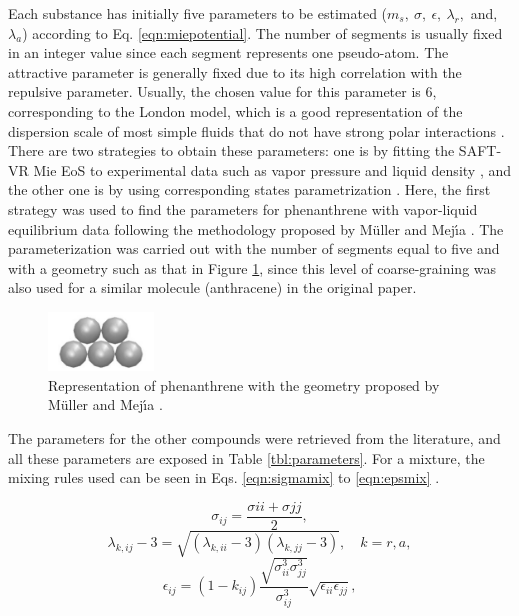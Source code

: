 \documentclass[final,12p,times,twocolumn]{elsarticle}
\begin{document}
	Each substance has initially five parameters to be estimated ($m_s,\ \sigma,\ \epsilon,\ \lambda_{r},$ and, $ \lambda_{a}$) according to Eq. \ref{eqn:miepotential}. The number of segments is usually fixed in an integer value since each segment represents one pseudo-atom. The attractive parameter is generally fixed due to its high correlation with the repulsive parameter. Usually, the chosen value for this parameter is 6, corresponding to the London model, which is a good representation of the dispersion scale of most simple fluids that do not have strong polar interactions \cite{ramrattan2015,herdes2015}.  There are two strategies to obtain these parameters: one is by fitting the SAFT-VR Mie EoS to experimental data such as vapor pressure and liquid density \cite{avendano2013}, and the other one is by using corresponding states parametrization \cite{mejia2014}. Here, the first strategy was used to find the parameters for phenanthrene with vapor-liquid equilibrium data \cite{murphy,osborn} following the methodology proposed by M\"{u}ller and Mej\'{\i}a \cite{muller2017}.  The parameterization was carried out with the number of segments equal to five and with a geometry such as that in Figure \ref{fig:fen5}, since this level of coarse-graining was also used for a similar molecule (anthracene) in the original paper.
	\begin{figure}[th]
		\centering
		\includegraphics[width=0.25\textwidth]{Figures/fen5}
		\caption{Representation of phenanthrene with the geometry proposed by M\"{u}ller and Mej\'{\i}a \cite{muller2017}.}
		\label{fig:fen5}
	\end{figure}
	
	The parameters for the other compounds were retrieved from the literature, and all these parameters are exposed in Table \ref{tbl:parameters}. For a mixture, the mixing rules used can be seen in Eqs. \ref{eqn:sigmamix} to \ref{eqn:epsmix} \cite{lafitte2013} .
	
	\begin{equation}
	\sigma_{ij} =\frac{\sigma{ii}+\sigma{jj}}{2},
	\label{eqn:sigmamix}
	\end{equation}
	\begin{equation}
	\lambda_{k,ij} -3 =\sqrt{(\lambda_{k,ii}-3)(\lambda_{k,jj}-3)}, \quad k=r,a,
	\label{eqn:lambdamix}
	\end{equation}
	\begin{equation}
	\label{eqn:epsmix}
	\epsilon_{ij} =(1-k_{ij})\frac{\sqrt{\sigma_{ii}^{3}\sigma_{jj}^{3}}}{\sigma_{ij}^{3}}\sqrt{\epsilon_{ii}\epsilon_{jj}},
	\end{equation}
\end{document}
